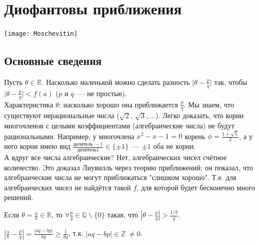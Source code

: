 \newpage

\section{Диофантовы приближения}
\texttt{[image: Moschevitin]}~\\

\subsection{Основные сведения}
	Пусть $\theta \in \mathbb{R}$. Насколько маленькой можно сделать разность $\lvert \theta - \frac{p}{q} \rvert$ так, чтобы $\lvert \theta - \frac{p}{q} \rvert < f(a)$ ($p$ и $q$ — не простые).\\
	Характеристика $\theta$: насколько хорошо она приближается $\frac{p}{q}$. Мы знаем, что существуют нерациональные числа ($\sqrt{2}, \, \sqrt{3},\dots$). Легко доказать, что корни многочленов с целыми коэффициентами (алгебраические числа) не будут рациональными. Например, у многочлена $x^2 - x -1 =0$ корень $\phi = \frac{1+\sqrt{5}}{2}$, а у него корни имею вид $\frac{\text{делитель } -1}{\text{делитель} 1} \in \{ \pm 1 \}$ — $\pm 1$ оба не корни.\\
	А вдруг все числа алгебраические? Нет, алгебраических чисел счётное количество. Это доказал Лиувилль через теорию приближений: он показал, что алгебраические числа не могут приближаться "слишком хорошо". Т.е. для алгебраических чисел не найдётся такой $f$, для которой будет бесконечно много решений.\\

\begin{statement}
	Если $\displaystyle \theta = \frac{a}{b} \in \mathbb{R}$, то $\displaystyle \forall \frac{p}{q} \in \mathbb{Q} \backslash \{ 0 \}$ такая, что
	$\displaystyle \left| \theta - \frac{p}{q} \right| > \frac{1/b}{q}$.
\end{statement}
\begin{pf}
	$\displaystyle \left| \frac{a}{b} - \frac{p}{q} \right| = \frac{|aq - bp|}{bq} \geq \frac{1}{bq}$, т.к. $|aq-bp| \in \mathbb{Z} \ \ne 0$.
\end{pf}

